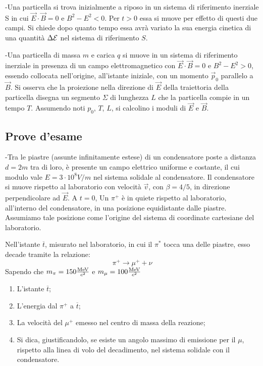 \documentclass[12pt,twoside,a4]{article}
\begin{document}
\begin{esercizio}
	-Una particella si trova inizialmente a riposo in un sistema di riferimento inerziale S in cui $\vec E \cdot \vec B=0 $ e $B^2- E^2<0$. Per $t>0$ essa si muove per effetto di questi due campi. Si chiede dopo quanto tempo essa avrà  variato la sua energia cinetica di una quantità  $\Delta \mathcal{E}$ nel sistema di riferimento $S$.
\end{esercizio}

\begin{esercizio}
	-Una particella di massa $m$ e carica $q$ si muove in un sistema di riferimento inerziale in presenza di un campo elettromagnetico con $\vec E \cdot \vec B=0$ e $B^2 - E^2 >0$, essendo collocata nell'origine, all'istante iniziale, con un momento $\vec p_0$ parallelo a $\vec B$. Si osserva che la proiezione nella direzione di $\vec E$ della traiettoria della particella disegna un segmento $\Sigma$ di lunghezza $L$ che la particella compie in un tempo $T$. Assumendo noti $p_0$, $T$, $L$, si calcolino i moduli di $\vec E$ e $\vec B$.
\end{esercizio}

\newpage
\subsection{Prove d'esame}

\begin{esercizio}
	-Tra le piastre (assunte infinitamente estese) di un condensatore poste a distanza $d = 2m$ tra di loro, è presente un campo elettrico uniforme e costante, il cui modulo vale $E = 3 \cdot 10^8V/m$ nel sistema solidale al condensatore. Il condensatore si muove rispetto al laboratorio con velocità $\vec v$, con $\beta=4/5$, in direzione perpendicolare ad $\vec E$. A $t = 0$, Un $\pi^+$ è in quiete rispetto al laboratorio, all'interno del condensatore, in una posizione equidistante dalle piastre. Assumiamo tale posizione come l'origine del sistema di coordinate cartesiane del laboratorio.
	
	Nell'istante $\overline t$, misurato nel laboratorio, in cui il $\pi^*$ tocca una delle piastre, esso decade tramite la relazione:
	\begin{equation*}
		\pi^+\rightarrow \mu^+ + \nu
	\end{equation*}
	Sapendo che $m_\pi = 150\frac{\mathrm{MeV}}{c^2}$ e $m_\mu = 100\frac{\mathrm{MeV}}{c^2}$ 
	\begin{enumerate}[label=(\textit{\roman*})]
		\item L'istante $\overline t$;
		\item L'energia dal $\pi^+$ a $\overline t$;
		\item La velocità del $\mu^+$ emesso nel centro di massa della reazione;
		\item Si dica, giustificandolo, se esiste un angolo massimo di emissione per il $\mu$, rispetto alla linea di volo del decadimento, nel sistema solidale con il condensatore.
	\end{enumerate}
\end{esercizio}
\end{document}

